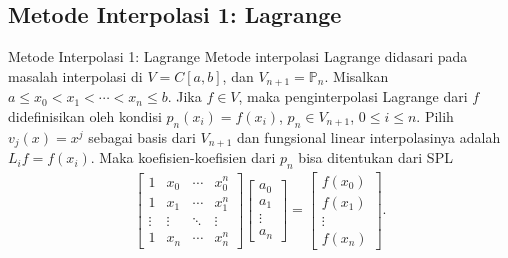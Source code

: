 \documentclass[xcolor={dvipsnames}, 9pt]{beamer}
\begin{document}
    \subsection{Metode Interpolasi 1: Lagrange}
    \begin{frame}{Metode Interpolasi 1: Lagrange}
        Metode interpolasi Lagrange didasari pada masalah interpolasi di $V=C[a,b]$, dan $V_{n+1}=\mathbb{P}_n$. Misalkan $a\leq x_0 < x_1 < \cdots < x_n \leq b$. Jika $f\in V$, maka penginterpolasi Lagrange dari $f$ didefinisikan oleh kondisi $p_n(x_i)=f(x_i)$, $p_n\in V_{n+1}$, $0\leq i\leq n$. Pilih $v_j(x)=x^j$ sebagai basis dari $V_{n+1}$ dan fungsional linear interpolasinya adalah $L_if = f(x_i)$. Maka koefisien-koefisien dari $p_n$ bisa ditentukan dari SPL
        \begin{align}
            \begin{bmatrix}
                1 & x_0 & \cdots & x_0^n \\
                1 & x_1 & \cdots & x_1^n \\
                \vdots & \vdots & \ddots & \vdots \\
                1 & x_n & \cdots & x_n^n
            \end{bmatrix}
            \begin{bmatrix}
                a_0 \\ a_1 \\ \vdots \\ a_n
            \end{bmatrix} = 
            \begin{bmatrix}
                f(x_0) \\ f(x_1) \\ \vdots \\ f(x_n)
            \end{bmatrix}.
        \end{align}
    \end{frame}
\end{document}
